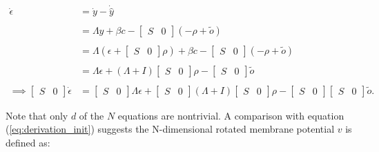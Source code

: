 \begin{enumerate}
\begin{align*}
\dot{\epsilon}
&=
\dot{y} - \dot{\hat{y}}
\\
\\
&= 
\Lambda y + \beta c - 
\begin{bmatrix}
S & 0
\end{bmatrix}
\left(
-\rho + \tilde{o}
\right)
\\
\\
&= 
\Lambda \left(
\epsilon + 
\begin{bmatrix}
S & 0
\end{bmatrix}
\rho
\right)
+ 
\beta c
-
\begin{bmatrix}
S & 0
\end{bmatrix}
\left(
-\rho + \tilde{o}
\right)
\\
\\
&= 
\Lambda \epsilon
+
\left( 
\Lambda + I
\right)
\begin{bmatrix}
S & 0
\end{bmatrix}
\rho
-
\begin{bmatrix}
S & 0
\end{bmatrix}
\tilde{o}
\\
\\
\implies
\begin{bmatrix}
S & 0
\end{bmatrix}
\dot{\epsilon}
&= 
\begin{bmatrix}
S & 0
\end{bmatrix}
\Lambda \epsilon
+
\begin{bmatrix}
S & 0
\end{bmatrix}
\left( 
\Lambda + I
\right)
\begin{bmatrix}
S & 0
\end{bmatrix}
\rho
-
\begin{bmatrix}
S & 0
\end{bmatrix}
\begin{bmatrix}
S & 0
\end{bmatrix}
\tilde{o}.
\end{align*}

Note that only $d$ of the $N$ equations are nontrivial. A comparison with equation (\ref{eq:derivation_init}) suggests the N-dimensional rotated membrane potential $v$ is defined as:


\end{enumerate}
